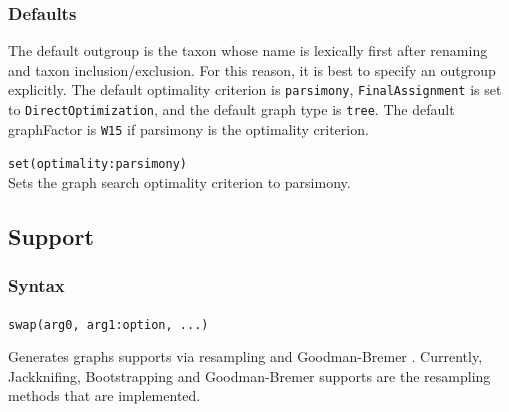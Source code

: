 	\subsubsection{Defaults} 
		The default outgroup is the taxon whose name is 
		lexically first after renaming and taxon inclusion/exclusion. For this reason, it is best to specify 
		an outgroup explicitly. The default optimality criterion is \texttt{parsimony}, 
		\texttt{FinalAssignment} is set to \texttt{DirectOptimization}, and the default 
		graph type is \texttt{tree}. The default graphFactor is \texttt{W15} if parsimony is the optimality 
		criterion.
		
	\begin{example}
		\item{\texttt{set(optimality:parsimony)}\\Sets the graph search optimality criterion to parsimony.}
						
	\end{example}

\subsection{Support}
	\subsubsection{Syntax}
		\texttt{swap(arg0, arg1:option, ...)}
		
	\begin{phygdescription}
		{Generates graphs supports via resampling \citep{Farrisetal1996} and Goodman-Bremer 
		\citep{Goodmanetal1982, bremer1994}. Currently, Jackknifing, Bootstrapping and 
		Goodman-Bremer supports are the resampling methods that are implemented.}
	\end{phygdescription}
		
